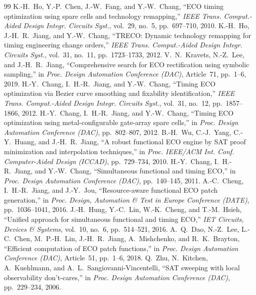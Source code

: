 \documentclass[journal]{IEEEtran}
\begin{document}
\begin{thebibliography}{99}
 K.-H.~Ho, Y.-P.~Chen, J.-W.~Fang, and Y.-W.~Chang, ``ECO timing optimization using spare cells and technology remapping,'' \emph{IEEE Trans. Comput.-Aided Design Integr. Circuits Syst.}, vol.~29, no.~5, pp.~697--710, 2010.
 K.-H.~Ho, J.-H.~R.~Jiang, and Y.-W.~Chang, ``TRECO: Dynamic technology remapping for timing engineering change orders,'' \emph{IEEE Trans. Comput.-Aided Design Integr. Circuits Syst.}, vol.~31, no.~11, pp.~1723--1733, 2012.
 V.~N.~Kravets, N.-Z.~Lee, and J.-H.~R.~Jiang, ``Comprehensive search for ECO rectification using symbolic sampling,'' in \emph{Proc. Design Automation Conference (DAC)}, Article~71, pp.~1--6, 2019.
 H.-Y.~Chang, I.~H.-R.~Jiang, and Y.-W.~Chang, ``Timing ECO optimization via Bezier curve smoothing and fixability identification,'' \emph{IEEE Trans. Comput.-Aided Design Integr. Circuits Syst.}, vol.~31, no.~12, pp.~1857--1866, 2012.
 H.-Y.~Chang, I.~H.-R.~Jiang, and Y.-W.~Chang, ``Timing ECO optimization using metal-configurable gate-array spare cells,'' in \emph{Proc. Design Automation Conference (DAC)}, pp.~802--807, 2012.
 B.-H.~Wu, C.-J.~Yang, C.-Y.~Huang, and J.-H.~R.~Jiang, ``A robust functional ECO engine by SAT proof minimization and interpolation techniques,'' in \emph{Proc. IEEE/ACM Int. Conf. Computer-Aided Design (ICCAD)}, pp.~729--734, 2010.
 H.-Y.~Chang, I.~H.-R.~Jiang, and Y.-W.~Chang, ``Simultaneous functional and timing ECO,'' in \emph{Proc. Design Automation Conference (DAC)}, pp.~140--145, 2011.
 A.-C.~Cheng, I.~H.-R.~Jiang, and J.-Y.~Jou, ``Resource-aware functional ECO patch generation,'' in \emph{Proc. Design, Automation \& Test in Europe Conference (DATE)}, pp.~1036--1041, 2016.
 J.-H.~Hung, Y.-C.~Lin, W.-K.~Cheng, and T.-M.~Hsieh, ``Unified approach for simultaneous functional and timing ECO,'' \emph{IET Circuits, Devices \& Systems}, vol.~10, no.~6, pp.~514--521, 2016.
 A.~Q.~Dao, N.-Z.~Lee, L.-C.~Chen, M.~P.-H.~Lin, J.-H.~R.~Jiang, A.~Mishchenko, and R.~K.~Brayton, ``Efficient computation of ECO patch functions,'' in \emph{Proc. Design Automation Conference (DAC)}, Article~51, pp.~1--6, 2018.
 Q.~Zhu, N.~Kitchen, A.~Kuehlmann, and A.~L.~Sangiovanni-Vincentelli, ``SAT sweeping with local observability don't-cares,'' in \emph{Proc. Design Automation Conference (DAC)}, pp.~229--234, 2006.

\end{thebibliography}
\end{document}
